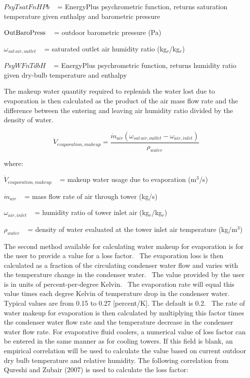 \(PsyTsatFnHPb\) ~ = EnergyPlus psychrometric function, returns saturation temperature given enthalpy and barometric pressure

\({\rm{OutBaroPress}}\) ~ = outdoor barometric pressure (Pa)

\({\omega_{sat\,air,outlet}}\) ~ = saturated outlet air humidity ratio (kg\(_{r}\)/kg\(_{r}\))

\(PsyWFnTdbH\) ~ = EnergyPlus psychrometric function, returns humidity ratio given dry-bulb temperature and enthalpy

The makeup water quantity required to replenish the water lost due to evaporation is then calculated as the product of the air mass flow rate and the difference between the entering and leaving air humidity ratio divided by the density of water.

\begin{equation}
{\dot V_{evaporation,makeup}} = \frac{{{{\dot m}_{air}}\left( {{\omega_{sat\,air,outlet}} - {\omega_{air,inlet}}} \right)}}{{{\rho_{water}}}}
\end{equation}

where:

\({\dot V_{evaporation,makeup}}\) ~ = makeup water usage due to evaporation (m\(^{3}\)/s)

\({\dot m_{air}}\) ~ = mass flow rate of air through tower (kg/s)

\({\omega_{air,inlet}}\) ~ = humidity ratio of tower inlet air (kg\(_{r}\)/kg\(_{r}\))

\({\rho_{water}}\) ~ = density of water evaluated at the tower inlet air temperature (kg/m\(^{3}\))

The second method available for calculating water makeup for evaporation is for the user to provide a value for a loss factor.~ The evaporation loss is then calculated as a fraction of the circulating condenser water flow and varies with the temperature change in the condenser water.~ The value provided by the user is in units of percent-per-degree Kelvin.~ The evaporation rate will equal this value times each degree Kelvin of temperature drop in the condenser water.~ Typical values are from 0.15 to 0.27 {[}percent/K{]}. The default is 0.2.~ The rate of water makeup for evaporation is then calculated by multiplying this factor times the condenser water flow rate and the temperature decrease in the condenser water flow rate. For evaporative fluid coolers, a numerical value of loss factor can be entered in the same manner as for cooling towers. If this field is blank, an empirical correlation will be used to calculate the value based on current outdoor dry bulb temperature and relative humidity. The following correlation from Qureshi and Zubair (2007) is used to calculate the loss factor:

